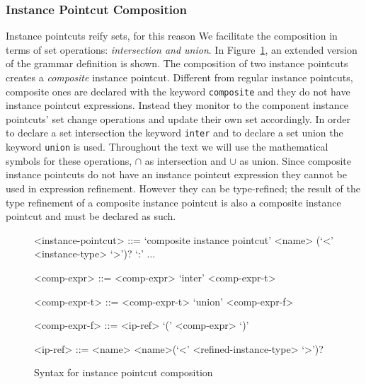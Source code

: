 \documentclass{acm_proc_article-sp}
\newcommand{\lstinln}[1]{\lstinline~#1~}
\begin{document}
\subsubsection{Instance Pointcut Composition}
\label{sect:compo}

Instance pointcuts reify sets, for this reason We facilitate the composition in terms of set operations: \emph{intersection and union}. 
In Figure~\ref{fig:grammar2}, an extended version of the grammar definition is shown. 
The composition of two instance pointcuts creates a \emph{composite} instance pointcut. Different from regular instance pointcuts, composite ones are declared with the keyword \lstinln{composite} and they do not have instance pointcut expressions. Instead they monitor to the component instance pointcuts' set change operations and update their own set accordingly. 
In order to declare a set intersection the keyword \lstinln{inter} and to declare a set union the keyword \lstinln{union} is used. Throughout the text we will use the mathematical symbols for these operations, $\cap$ as intersection and $\cup$ as union. Since composite instance pointcuts do not have an instance pointcut expression they cannot be used in expression refinement. However they can be type-refined; the result of the type refinement of a composite instance pointcut is also a composite instance pointcut and must be declared as such. 

\begin{figure}[h]
\begin{grammar}
<instance-pointcut> ::= `composite instance pointcut' <name> (`<' <instance-type> `>')? `:'
... 

<comp-expr> ::= <comp-expr> `inter' <comp-expr-t>  

<comp-expr-t> ::= <comp-expr-t> `union' <comp-expr-f>  

<comp-expr-f> ::= <ip-ref> \alt `(' <comp-expr> `)'

<ip-ref> ::= <name> \alt <name>(`<' <refined-instance-type> `>')?

\end{grammar}
\caption{Syntax for instance pointcut composition}
\label{fig:grammar2}
\end{figure}

\end{document}
